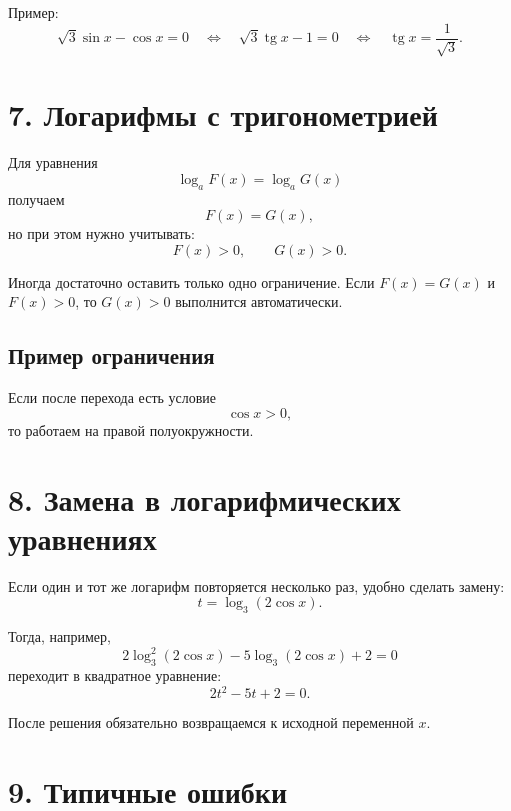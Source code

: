 \documentclass[a4paper,12pt]{article}
\providecommand{\tg}{\operatorname{tg}}
\begin{document}
Пример:
\[
\sqrt3\sin x-\cos x=0
\quad \Longleftrightarrow \quad
\sqrt3\tg x-1=0
\quad \Longleftrightarrow \quad
\tg x=\frac{1}{\sqrt3}.
\]

\section*{7. Логарифмы с тригонометрией}

Для уравнения
\[
\log_a F(x)=\log_a G(x)
\]
получаем
\[
F(x)=G(x),
\]
но при этом нужно учитывать:
\[
F(x)>0,\qquad G(x)>0.
\]

Иногда достаточно оставить только одно ограничение. Если \(F(x)=G(x)\) и \(F(x)>0\), то \(G(x)>0\) выполнится автоматически.

\subsection*{Пример ограничения}

Если после перехода есть условие
\[
\cos x>0,
\]
то работаем на правой полуокружности.

\begin{center}
\end{center}

\section*{8. Замена в логарифмических уравнениях}

Если один и тот же логарифм повторяется несколько раз, удобно сделать замену:
\[
t=\log_3(2\cos x).
\]

Тогда, например,
\[
2\log_3^2(2\cos x)-5\log_3(2\cos x)+2=0
\]
переходит в квадратное уравнение:
\[
2t^2-5t+2=0.
\]

После решения обязательно возвращаемся к исходной переменной \(x\).

\section*{9. Типичные ошибки}
\end{document}
